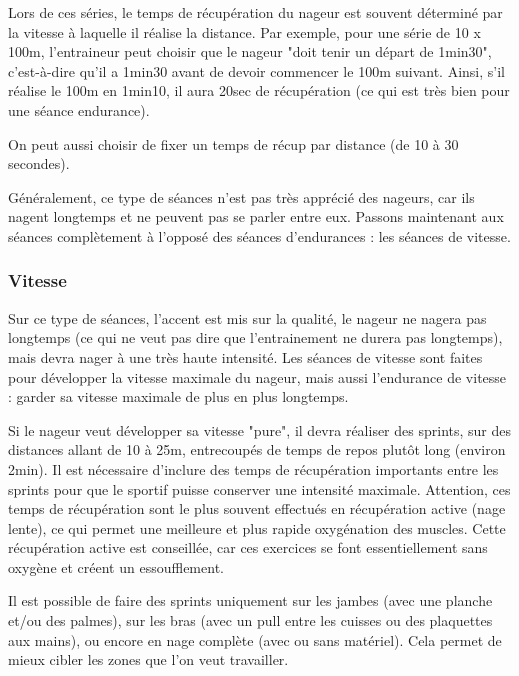 \vspace{12pt}

Lors de ces séries, le temps de récupération du nageur est souvent déterminé par la vitesse à laquelle il réalise la distance. Par exemple, pour une série de 10 x 100m, l'entraineur peut choisir que le nageur "doit tenir un départ de 1min30", c'est-à-dire qu'il a 1min30 avant de devoir commencer le 100m suivant. Ainsi, s'il réalise le 100m en 1min10, il aura 20sec de récupération (ce qui est très bien pour une séance endurance).

On peut aussi choisir de fixer un temps de récup par distance (de 10 à 30 secondes).

\vspace{12pt}

Généralement, ce type de séances n'est pas très apprécié des nageurs, car ils nagent longtemps et ne peuvent pas se parler entre eux. Passons maintenant aux séances complètement à l'opposé des séances d'endurances : les séances de vitesse.


\subsubsection{Vitesse}\label{vit}

Sur ce type de séances, l'accent est mis sur la qualité, le nageur ne nagera pas longtemps (ce qui ne veut pas dire que l'entrainement ne durera pas longtemps), mais devra nager à une très haute intensité. Les séances de vitesse sont faites pour développer la vitesse maximale du nageur, mais aussi l'endurance de vitesse : garder sa vitesse maximale de plus en plus longtemps.

\vspace{12pt}

Si le nageur veut développer sa vitesse "pure", il devra réaliser des sprints, sur des distances allant de 10 à 25m, entrecoupés de temps de repos plutôt long (environ 2min). Il est nécessaire d'inclure des temps de récupération importants entre les sprints pour que le sportif puisse conserver une intensité maximale. Attention, ces temps de récupération sont le plus souvent effectués en récupération active (nage lente), ce qui permet une meilleure et plus rapide oxygénation des muscles. Cette récupération active est conseillée, car ces exercices se font essentiellement sans oxygène et créent un essoufflement.

Il est possible de faire des sprints uniquement sur les jambes (avec une planche et/ou des palmes), sur les bras (avec un pull entre les cuisses ou des plaquettes aux mains), ou encore en nage complète (avec ou sans matériel). Cela permet de mieux cibler les zones que l'on veut travailler.

